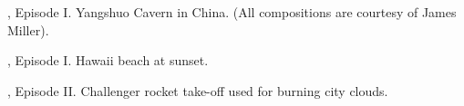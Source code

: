 \begin{minipage}{\textwidth}
\par
\doom{}, Episode I. Yangshuo Cavern in China. (All compositions are courtesy of James Miller).\\
\par
{}
\end{minipage}
\par






\begin{minipage}{\textwidth}
\par
\doomii{}, Episode I. Hawaii beach at sunset.\\
\par
{}
\end{minipage}


\begin{minipage}{\textwidth}
\par
\doomii{}, Episode II. Challenger rocket take-off used for burning city clouds.\\
\par
{}
\end{minipage}







